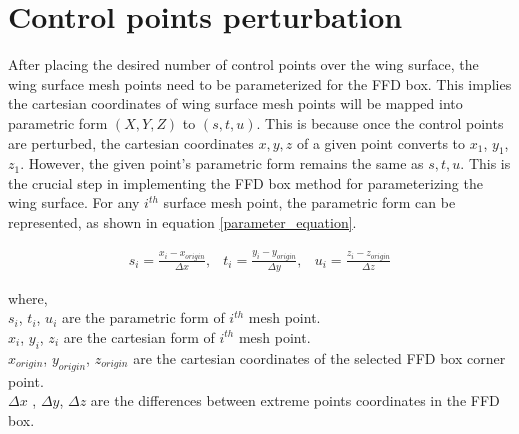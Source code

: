 \section{Control points perturbation}
After placing the desired number of control points over the wing surface, the wing surface mesh points need to be parameterized for the FFD box. This implies the cartesian coordinates of wing surface mesh points will be mapped into parametric form $(X, Y, Z)$ to $(s,t,u)$. This is because once the control points are perturbed, the cartesian coordinates $x,y,z$ of a given point converts to $x_1$, $y_1$, $z_1$. However, the given point's parametric form remains the same as $s,t,u$. This is the crucial step in implementing the FFD box method for parameterizing the wing surface. For any $i^{th}$ surface mesh point, the parametric form can be represented, as shown in equation \ref{parameter_equation}.

\begin{equation}
\begin{array}{lll}
s_i = \frac{x_i - x_{origin}}{\Delta x}, & t_i = \frac{y_i - y_{origin}}{\Delta y}, & u_i = \frac{z_i - z_{origin}}{\Delta z} 
\end{array}
\label{parameter_equation}
\end{equation}

where,\\
$s_i$, $t_i$, $u_i$ are the parametric form of $i^{th}$ mesh point. \\
$x_i$, $y_i$, $z_i$ are the cartesian form of $i^{th}$ mesh point. \\
$x_{origin}$, $y_{origin}$, $z_{origin}$ are the cartesian coordinates of the selected FFD box corner point. \\
$\Delta x$ , $\Delta y$, $\Delta z$ are the differences between extreme points coordinates in the FFD box.\\

